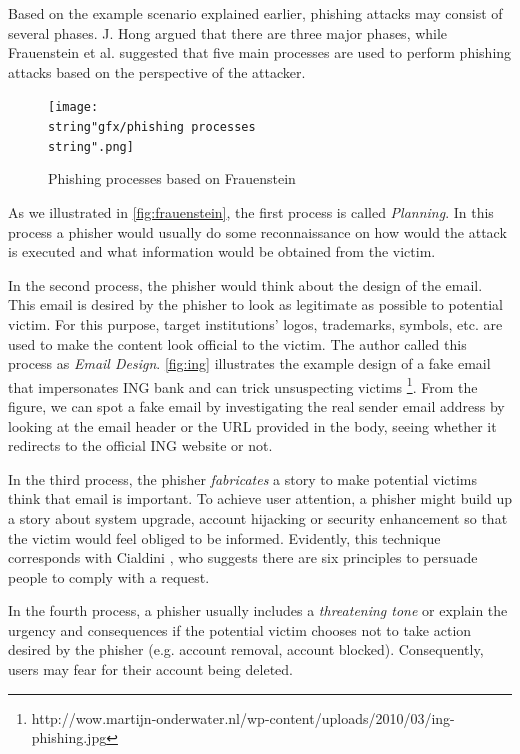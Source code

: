 Based on the example scenario explained earlier, phishing attacks
may consist of several phases. J. Hong \citep{hong:2012} argued that
there are three major phases, while Frauenstein et al. \citep{frauenstein:2013}
suggested that five main processes are used to perform phishing attacks
based on the perspective of the attacker.

\begin{figure}
\begin{centering}
\texttt{[image: \\string"gfx/phishing processes\\string".png]}
\par\end{centering}

\protect\caption{\label{fig:frauenstein}Phishing processes based on Frauenstein\citep{frauenstein:2013}}
\end{figure}


As we illustrated in \autoref{fig:frauenstein}, the first process
is called \textit{Planning}. In this process a phisher would usually
do some reconnaissance on how would the attack is executed and what
information would be obtained from the victim. 

In the second process, the phisher would think about the design of
the email. This email is desired by the phisher to look as legitimate
as possible to potential victim. For this purpose, target institutions'
logos, trademarks, symbols, etc. are used to make the content look
official to the victim. The author called this process as \textit{Email
Design}. \autoref{fig:ing} illustrates the example design of a fake
email that impersonates ING bank and can trick unsuspecting victims%
\footnote{http://wow.martijn-onderwater.nl/wp-content/uploads/2010/03/ing-phishing.jpg%
}. From the figure, we can spot a fake email by investigating the real
sender email address by looking at the email header or the URL provided
in the body, seeing whether it redirects to the official ING website
or not. 

In the third process, the phisher \textit{fabricates} a story to make
potential victims think that email is important. To achieve user attention,
a phisher might build up a story about system upgrade, account hijacking
or security enhancement so that the victim would feel obliged to be
informed. Evidently, this technique corresponds with Cialdini \citep{cialdini:2001},
who suggests there are six principles to persuade people to comply
with a request. 

In the fourth process, a phisher usually includes a \textit{threatening
tone} or explain the urgency and consequences if the potential victim
chooses not to take action desired by the phisher (e.g. account removal,
account blocked). Consequently, users may fear for their account being
deleted. 

